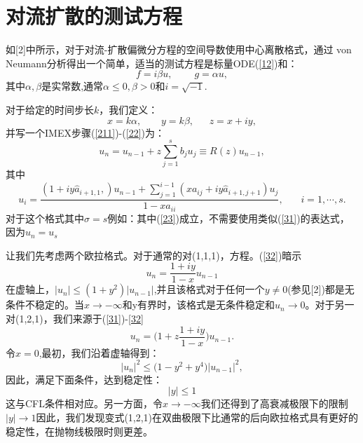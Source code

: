\documentclass[12pt,a4paper]{article}
\numberwithin{equation}{section}
\begin{document}
\section{对流扩散的测试方程}

如[2]中所示，对于对流-扩散偏微分方程的空间导数使用中心离散格式，通过 von Neumann分析得出一个简单，适当的测试方程是标量ODE(\ref{12})和：
\begin{equation*}
f=i\beta u,~~~~~~~~~~g=\alpha u,
\end{equation*}
其中$\alpha,\beta$是实常数,通常$\alpha\le 0,\beta>0$和$i=\sqrt{-1}$.

对于给定的时间步长$k$，我们定义：
\begin{equation*}
x=k\alpha,~~~~~~~~~y=k\beta,~~~~~~~z=x+iy,
\end{equation*}
并写一个IMEX步骤(\ref{211})-(\ref{22})为：
\begin{equation}
u_{n}=u_{n-1}+z\sum_{j=1}^{s}b_{j}u_{j}\equiv R(z)u_{n-1},
\label{31}
\end{equation}
其中
\begin{equation}
u_{i}=\frac{(1+iy\widehat{a}_{i+1,1},)u_{n-1}+\sum_{j=1}^{i-1}(xa_{ij}+iy\widehat{a}_{i+1,j+1})u_{j}}{1-xa_{ii}},~~~~~~~~i=1,\cdots,s.
\label{32}
\end{equation}
对于这个格式其中$\sigma=s$例如：其中(\ref{23})成立，不需要使用类似(\ref{31})的表达式，因为$u_{n}=u_{s}$

让我们先考虑两个欧拉格式。对于通常的对(1,1,1)，方程。(\ref{32})暗示
\begin{equation*}
u_{n}=\frac{1+iy}{1-x} u_{n-1}
\end{equation*}
在虚轴上，$|u_{n}|\le (1+y^2)|u_{n-1}|$,并且该格式对于任何一个$y\ne 0$(参见[2])都是无条件不稳定的。当$x\to -\infty$和y有界时，该格式是无条件稳定和$u_{n}\to 0$。对于另一对(1,2,1)，我们来源于(\ref{31})-\ref{32}
\begin{equation*}
u_{n}=\bigg(1+z\frac{1+iy}{1-x}\biggl)u_{n-1}.
\end{equation*}
令$x=0$,最初，我们沿着虚轴得到：
\begin{equation*}
|u_{n}|^2\le \bigg(1-y^2+y^4\biggl)|u_{n-1}|^2,
\end{equation*}
因此，满足下面条件，达到稳定性：
\begin{equation*}
|y|\le 1
\end{equation*}
这与CFL条件相对应。另一方面，令$x\to -\infty$我们还得到了高衰减极限下的限制$|y|\to 1$因此，我们发现变式(1,2,1)在双曲极限下比通常的后向欧拉格式具有更好的稳定性，在抛物线极限时则更差。
\end{document}
